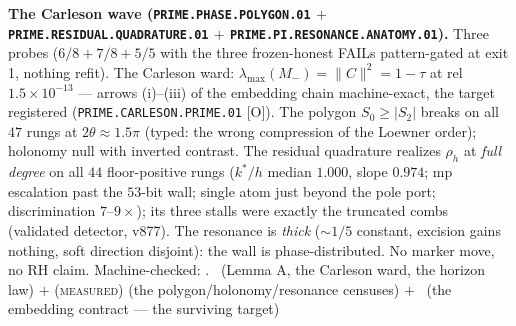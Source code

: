 \documentclass[11pt,a4paper]{article}
\theoremstyle{definition}
\begin{document}
\par\smallskip\noindent\textbf{The Carleson wave
(\texttt{PRIME.PHASE.POLYGON.01} $+$
\texttt{PRIME.RESIDUAL.\allowbreak QUADRATURE.01} $+$
\texttt{PRIME.PI.RESONANCE.\allowbreak ANATOMY.01}).}
Three probes ($6/8 + 7/8 + 5/5$ with the three frozen-honest
FAILs pattern-gated at exit 1, nothing refit).  The Carleson
ward: $\lambda_{\max}(M_-) = \|C\|^2 = 1 - \tau$ at rel
$1.5\times10^{-13}$ --- arrows (i)--(iii) of the embedding chain
machine-exact, the target registered
(\texttt{PRIME.CARLESON.PRIME.01} [O]).  The polygon $S_0 \ge
|S_2|$ breaks on all $47$ rungs at $2\theta \approx 1.5\pi$
(typed: the wrong compression of the Loewner order); holonomy
null with inverted contrast.  The residual quadrature realizes
$\rho_h$ at \emph{full degree} on all $44$ floor-positive rungs
($k^*/h$ median $1.000$, slope $0.974$; mp escalation past the
$53$-bit wall; single atom just beyond the pole port;
discrimination $7$--$9\times$); its three stalls were exactly
the truncated combs (validated detector, v877).  The resonance
is \emph{thick} ($\sim 1/5$ constant, excision gains nothing,
soft direction disjoint): the wall is phase-distributed.  No
marker move, no RH claim.
Machine-checked: .
\mE\ (Lemma A, the Carleson ward, the horizon law) $+$
(\textsc{measured}) (the polygon/holonomy/resonance censuses)
$+$ \mO\ (the embedding contract --- the surviving target)
\par\smallskip
\end{document}
